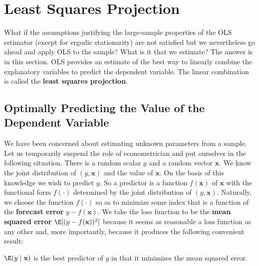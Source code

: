 
\section{Least Squares Projection}
\label{sec:2.9}

What if the assumptions justifying the large-sample properties of the OLS estimator
(except for ergodic stationarity) are not satisfied but we nevertheless go ahead and
apply OLS to the sample? What is it that we estimate? The answer is in this section.
OLS provides an estimate of the best way to linearly combine the explanatory
variables to predict the dependent variable. The linear combination is called
the \textbf{least squares projection}.

\subsection*{Optimally Predicting the Value of the Dependent Variable}

We have been concerned about estimating unknown parameters from a sample.
Let us temporarily suspend the role of econometrician and put ourselves in the
following situation. There is a random scalar $y$ and a random vector $\mathbf{x}$. We know
the joint distribution of $(y, \mathbf{x})$ and the value of $\mathbf{x}$. On the basis of this knowledge
we wish to predict $y$. So a predictor is a function $f(\mathbf{x})$ of $\mathbf{x}$ with the functional
form $f(\cdot)$ determined by the joint distribution of $(y, \mathbf{x})$. Naturally, we choose the
function $f(\cdot)$ so as to minimize some index that is a function of the \textbf{forecast error}
$y - f(\mathbf{x})$. We take the loss function to be the \textbf{mean squared error} $\E[(y - f(\mathbf{x}))^2]$
because it seems as reasonable a loss function as any other and, more importantly,
because it produces the following convenient result:

\begin{proposition}[2.7]
\label{prop:2.7}
$\E(y \mid \mathbf{x})$ is the best predictor of $y$ in that it minimizes the mean
squared error.
\end{proposition}

